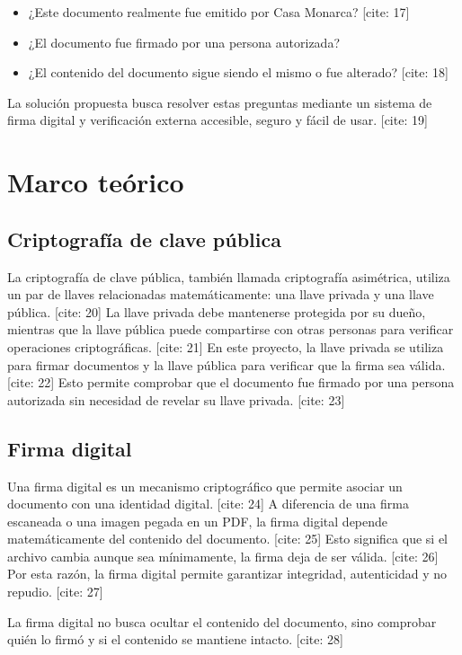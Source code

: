 \documentclass[10pt]{article} [cite: 1]
\begin{document}
\begin{itemize}
    \item ¿Este documento realmente fue emitido por Casa Monarca? [cite: 17]
    \item ¿El documento fue firmado por una persona autorizada?
    \item ¿El contenido del documento sigue siendo el mismo o fue alterado? [cite: 18]
\end{itemize}

La solución propuesta busca resolver estas preguntas mediante un sistema de firma digital y verificación externa accesible, seguro y fácil de usar. [cite: 19]

\section{Marco teórico}

\subsection{Criptografía de clave pública}

La criptografía de clave pública, también llamada criptografía asimétrica, utiliza un par de llaves relacionadas matemáticamente: una llave privada y una llave pública. [cite: 20] La llave privada debe mantenerse protegida por su dueño, mientras que la llave pública puede compartirse con otras personas para verificar operaciones criptográficas. [cite: 21] En este proyecto, la llave privada se utiliza para firmar documentos y la llave pública para verificar que la firma sea válida. [cite: 22] Esto permite comprobar que el documento fue firmado por una persona autorizada sin necesidad de revelar su llave privada. [cite: 23]

\subsection{Firma digital}

Una firma digital es un mecanismo criptográfico que permite asociar un documento con una identidad digital. [cite: 24] A diferencia de una firma escaneada o una imagen pegada en un PDF, la firma digital depende matemáticamente del contenido del documento. [cite: 25] Esto significa que si el archivo cambia aunque sea mínimamente, la firma deja de ser válida. [cite: 26] Por esta razón, la firma digital permite garantizar integridad, autenticidad y no repudio. [cite: 27]

\begin{infobox}
La firma digital no busca ocultar el contenido del documento, sino comprobar quién lo firmó y si el contenido se mantiene intacto. [cite: 28]
\end{infobox}
\end{document}

